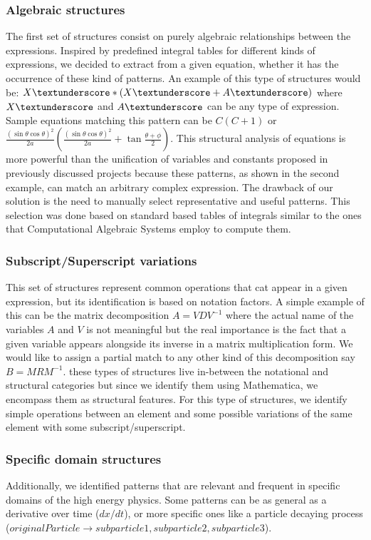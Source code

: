 \subsubsection{Algebraic structures}
The first set of structures consist on purely algebraic relationships between the expressions.
Inspired by predefined integral tables for different kinds of expressions, we decided to extract from a given equation, whether it has the occurrence of these kind of patterns.
An example of this type of structures would be: $X\textunderscore*(X\textunderscore + A\textunderscore)$ where $X\textunderscore$ and $A\textunderscore$ can be any type of expression. Sample equations matching this pattern can be $C (C+1)$ or $\frac{(\sin{\theta}\cos{\theta})^2}{2a} (\frac{(\sin{\theta}\cos{\theta})^2}{2a} + \tan{\frac{\theta+\phi}{2}})$. This structural analysis of equations is more powerful than the unification of variables and constants proposed in previously discussed projects because these patterns, as shown in the second example, can match an arbitrary complex expression. The drawback of our solution is the need to manually select representative and useful patterns. This selection was done based on standard based tables of integrals similar to the ones that Computational Algebraic Systems employ to compute them.

\subsubsection{Subscript/Superscript variations}
This set of structures represent common operations that cat appear in a given expression, but its identification is based on notation factors. A simple example of this can be the matrix decomposition $A = VDV^{-1}$ where the actual name of the variables $A$ and $V$ is not meaningful but the real importance is the fact that a given variable appears alongside its inverse in a matrix multiplication form. We would like to assign a partial match to any other kind of this decomposition say $B = MRM^{-1}$. these types of structures live in-between the notational and structural categories but since we identify them using Mathematica, we encompass them as structural features. For this type of structures, we identify simple operations between an element and some possible variations of the same element with some subscript/superscript.

\subsubsection{Specific domain structures}
Additionally, we identified patterns that are relevant and frequent in specific domains of the high energy physics. Some patterns can be as general as a derivative over time ($dx/dt$), or more specific ones like a particle decaying process ($originalParticle \rightarrow subparticle1, subparticle2, subparticle3$).


